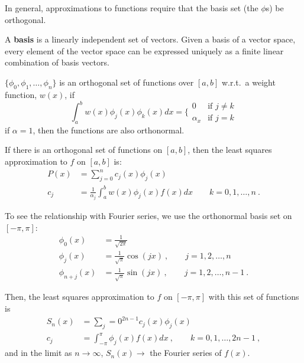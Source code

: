 \documentclass[12pt]{article}
\begin{document}
In general, approximations to functions require that the basis set (the $\phi$s) be orthogonal. 

A \textbf{basis} is a linearly independent set of vectors. Given a basis of a vector space, every element of the vector space can be expressed uniquely as a finite linear combination of basis vectors.

$\{ \phi_0, \phi_1, \dots, \phi_n\}$ is an orthogonal set of functions over $[a,b]$ w.r.t.\ a weight function, $w(x)$, if
%
\begin{equation}
\int_a^b w(x) \phi_j(x) \phi_k(x) dx = \biggl\{
\begin{array}{ll}
0 & \mbox{if } j \neq k \\
\alpha_x & \mbox{if } j = k
\end{array} \nonumber
\end{equation}
%
if $\alpha = 1$, then the functions are also orthonormal.

If there is an orthogonal set of functions on $[a,b]$, then the least squares approximation to $f$ on $[a,b]$ is:
\begin{align*}
P(x) &= \sum_{j=0}^n c_j(x) \phi_j(x) \\
c_j &= \frac{1}{\alpha_j} \int_a^b w(x)\phi_j(x)f(x)dx \qquad k=0, 1, \dots, n\:.
\end{align*}

To see the relationship with Fourier series, we use the orthonormal basis set on $[-\pi, \pi]$:
%
\begin{align*}
\phi_0(x) &= \frac{1}{\sqrt{2\pi}} \\
\phi_j(x) &= \frac{1}{\sqrt{\pi}}\cos(jx)\:, \qquad j=1,2,\dots,n \\
\phi_{n+j}(x) &= \frac{1}{\sqrt{\pi}}\sin(jx)\:, \qquad j=1,2,\dots,n-1 \:.
\end{align*}

Then, the least squares approximation to $f$ on $[-\pi,\pi]$ with this set of functions is
%
\begin{align*}
S_n(x) &= \sum_j=0^{2n-1} c_j(x) \phi_j(x) \\
c_j &= \int_{-\pi}^{\pi} \phi_j(x)f(x)dx \:, \qquad k=0, 1, \dots, 2n-1 \:,
\end{align*}
%
and in the limit as $n \rightarrow \infty$, $S_n(x) \rightarrow$ the Fourier series of $f(x)$.  


%
% 
\end{document}
